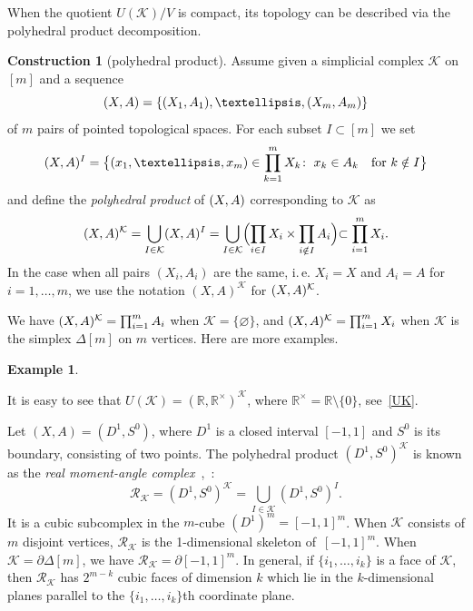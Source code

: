 \documentclass[a4paper]{amsart}
\theoremstyle{definition}
\newtheorem{example}[theorem]{Example}
\newtheorem{construction}[theorem]{Construction}
\theoremstyle{remark}
\numberwithin{equation}{section}
\def\R{\mathbb R}
\def\R{\mathbb R}
\def\sK{\mathcal K}
\newcommand{\mb}[1]{{\textbf {\textit#1}}}
\def\rk{\mathcal R_{\mathcal K}}
\newcommand{\<}{\langle}
\renewcommand{\>}{\rangle}
\begin{document}
When the quotient $U(\sK)/V$ is compact, its topology can be described via the polyhedral product decomposition.

\begin{construction}[polyhedral product]\label{polpr}
Assume given a simplicial complex  $\sK$ on~$[m]$ and a sequence
\[
  (\mb X,\mb A)=\{(X_1,A_1),\ldots,(X_m,A_m)\}
\]
of $m$ pairs of pointed topological spaces. For each
subset $I\subset[m]$ we set
\begin{equation}\label{XAI}
  (\mb X,\mb A)^I=\bigl\{(x_1,\ldots,x_m)\in
  \prod_{k=1}^m X_k\colon\; x_k\in A_k\quad\text{for }k\notin I\bigl\}
\end{equation}
and define the \emph{polyhedral product} of $(\mb X,\mb A)$
corresponding to $\sK$ as
\[
  (\mb X,\mb A)^{\sK}=\bigcup_{I\in\mathcal K}(\mb X,\mb A)^I=
  \bigcup_{I\in\mathcal K}
  \Bigl(\prod_{i\in I}X_i\times\prod_{i\notin I}A_i\Bigl)\subset\prod_{i=1}^m X_i.
\]
In the case when all pairs $(X_i,A_i)$ are the same, i.\,e.
$X_i=X$ and $A_i=A$ for $i=1,\ldots,m$, we use the notation
$(X,A)^\sK$ for $(\mb X,\mb A)^\sK$. 
\end{construction}

We have $(\mb X,\mb A)^{\sK}=\prod_{i=1}^m A_i$ when 
$\sK=\{\varnothing\}$, and
$(\mb X,\mb A)^{\sK}=\prod_{i=1}^m X_i$ when $\sK$ is the simplex 
$\varDelta[m]$ on $m$ vertices. Here are more examples.

\begin{example}\label{expp}\ 

 It is easy to see that $U(\sK)=(\R,\R^\times)^\sK$, where $\R^\times=\R\setminus\{0\}$, see~\eqref{UK}.

 Let $(X,A)=(D^1,S^0)$, where $D^1$ is a closed
interval $[-1,1]$ and $S^0$ is
its boundary, consisting of two points. The polyhedral product
$(D^1,S^0)^\sK$ is known as the \emph{real moment-angle
complex}~\cite[\S3.5]{bu-pa00},~\cite{bu-pa15}:
\[
  \rk=(D^1,S^0)^\sK=\bigcup_{I\in\sK}(D^1,S^0)^I.
\]
It is a cubic subcomplex in the $m$-cube $(D^1)^m=[-1,1]^m$. When
$\sK$ consists of $m$ disjoint vertices, $\rk$ is the 1-dimensional
skeleton of~$[-1,1]^m$. When
$\sK=\partial\varDelta[m]$, we have $\rk=\partial[-1,1]^m$. In general, if $\{i_1,\ldots,i_k\}$ is a face of
$\sK$, then $\rk$ has $2^{m-k}$ cubic faces of dimension $k$
which lie in the $k$-dimensional planes parallel to the
$\{i_1,\ldots,i_k\}$th coordinate plane.
\end{example}
\end{document}
